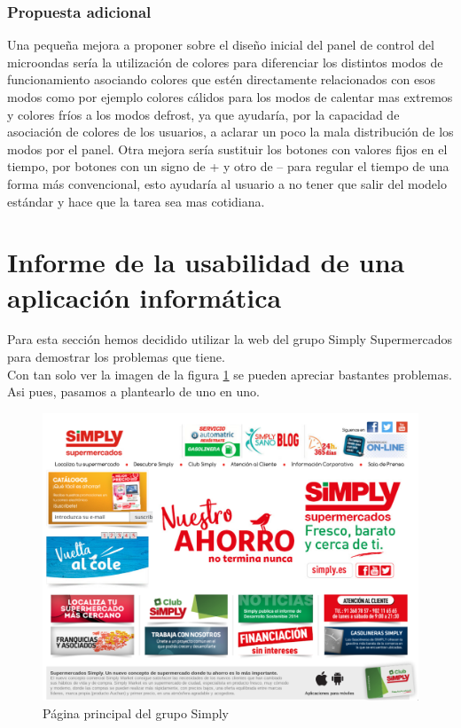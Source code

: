 \documentclass[a4paper,11pt]{article}
\begin{document}
\subsubsection{Propuesta adicional}
Una pequeña mejora a proponer sobre el diseño inicial del panel de control del microondas sería la utilización de colores para diferenciar los distintos modos de funcionamiento asociando colores que estén directamente relacionados con esos modos como por ejemplo colores cálidos para los modos de calentar mas extremos y colores fríos a los modos defrost, ya que ayudaría, por la capacidad de asociación de colores de los usuarios, a aclarar un poco la mala distribución de los modos por el panel. Otra mejora sería sustituir los botones con valores fijos en el tiempo, por botones con un signo de + y otro de – para regular el tiempo de una forma más convencional, esto ayudaría al usuario a no tener que salir del modelo estándar y hace que la tarea sea mas cotidiana.


\section{Informe de la usabilidad de una aplicación informática}
Para esta sección hemos decidido utilizar la web del grupo Simply Supermercados \cite{webSimply} para demostrar los problemas que tiene.\\
Con tan solo ver la imagen de la figura \ref{fig:pagprin} se pueden apreciar bastantes problemas. Asi pues, pasamos a plantearlo de uno en uno.

\begin{figure}[h!]
 \centering
 \includegraphics[scale=0.5]{webPrincipal.png}
 \caption{Página principal del grupo Simply}
 \label{fig:pagprin}
\end{figure}
\end{document}
